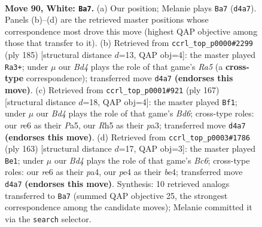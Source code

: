 \documentclass[11pt]{article}
\begin{document}
\clearpage

\begin{figure}[p]\centering
\begin{subfigure}{0.46\textwidth}\centering
\resizebox{\linewidth}{!}{%
\newchessgame
\chessboard[
  setfen={5k2/8/4r3/7R/3Bp3/1K3p1P/5P2/8 w - - 5 90},
  showmover=false,
  pgfstyle=straightmove, color=movearrow, markmove={d4-a7}
]}
\caption{}
\end{subfigure}\hfill
\begin{subfigure}{0.46\textwidth}\centering
\resizebox{\linewidth}{!}{%
\newchessgame
\chessboard[
  setfen={8/8/7k/5R2/r5p1/3K2P1/5P2/8 b - - 91 93},
  showmover=false,
  pgfstyle=straightmove, color=movearrow, markmove={a4-a3}
]}
\caption{}
\end{subfigure}
\\[4pt]
\begin{subfigure}{0.46\textwidth}\centering
\resizebox{\linewidth}{!}{%
\newchessgame
\chessboard[
  setfen={5k2/8/7P/pp4P1/3K4/P2b4/8/8 b - - 34 84},
  showmover=false,
  pgfstyle=straightmove, color=movearrow, markmove={d3-f1}
]}
\caption{}
\end{subfigure}\hfill
\begin{subfigure}{0.46\textwidth}\centering
\resizebox{\linewidth}{!}{%
\newchessgame
\chessboard[
  setfen={8/2K1k3/5p2/5P2/P3B2p/2b4P/8/8 b - - 59 82},
  showmover=false,
  pgfstyle=straightmove, color=movearrow, markmove={c3-e1}
]}
\caption{}
\end{subfigure}
\caption{\textbf{Move 90, White: \texttt{Ba7}.} (a) Our position; Melanie plays \texttt{Ba7} (\texttt{d4a7}). Panels (b)--(d) are the retrieved master positions whose correspondence most drove this move (highest QAP objective among those that transfer to it). (b) Retrieved from \texttt{ccrl\_top\_p0000\#2299} (ply 185) [structural distance $d$=13, QAP obj=4]: the master played \texttt{Ra3+}; under $\mu$ our \emph{Bd4} plays the role of that game's \emph{Ra5} (a \textbf{cross-type} correspondence); transferred move \texttt{d4a7} \textbf{(endorses this move)}. (c) Retrieved from \texttt{ccrl\_top\_p0001\#921} (ply 167) [structural distance $d$=18, QAP obj=4]: the master played \texttt{Bf1}; under $\mu$ our \emph{Bd4} plays the role of that game's \emph{Bd6}; cross-type roles: our \emph{r}e6 as their \emph{P}a5, our \emph{R}h5 as their \emph{p}a3; transferred move \texttt{d4a7} \textbf{(endorses this move)}. (d) Retrieved from \texttt{ccrl\_top\_p0003\#1786} (ply 163) [structural distance $d$=17, QAP obj=3]: the master played \texttt{Be1}; under $\mu$ our \emph{Bd4} plays the role of that game's \emph{Bc6}; cross-type roles: our \emph{r}e6 as their \emph{p}a4, our \emph{p}e4 as their \emph{b}e4; transferred move \texttt{d4a7} \textbf{(endorses this move)}. Synthesis: 10 retrieved analogs transferred to \texttt{Ba7} (summed QAP objective 25, the strongest correspondence among the candidate moves); Melanie committed it via the \texttt{search} selector.}
\label{fig:thought-m178}
\end{figure}
\end{document}
